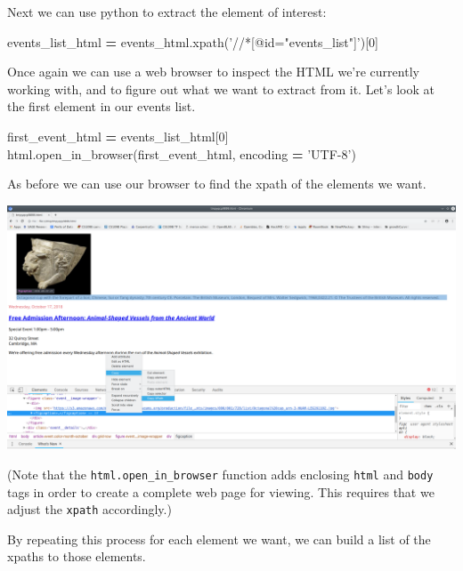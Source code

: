 \documentclass[
]{book}
\newenvironment{Shaded}{\begin{snugshade}}{\end{snugshade}}
\newcommand{\DecValTok}[1]{\textcolor[rgb]{0.00,0.00,0.81}{#1}}
\newcommand{\NormalTok}[1]{#1}
\newcommand{\OperatorTok}[1]{\textcolor[rgb]{0.81,0.36,0.00}{\textbf{#1}}}
\newcommand{\StringTok}[1]{\textcolor[rgb]{0.31,0.60,0.02}{#1}}
\begin{document}
Next we can use python to extract the element of interest:

\begin{Shaded}
\begin{Highlighting}[]
\NormalTok{events_list_html }\OperatorTok{=}\NormalTok{ events_html.xpath(}\StringTok{'//*[@id="events_list"]'}\NormalTok{)[}\DecValTok{0}\NormalTok{]}
\end{Highlighting}
\end{Shaded}

Once again we can use a web browser to inspect the HTML we're
currently working with, and to figure out what we want to extract from
it. Let's look at the first element in our events list.

\begin{Shaded}
\begin{Highlighting}[]
\NormalTok{first_event_html }\OperatorTok{=}\NormalTok{ events_list_html[}\DecValTok{0}\NormalTok{]}
\NormalTok{html.open_in_browser(first_event_html, encoding }\OperatorTok{=} \StringTok{'UTF-8'}\NormalTok{)}
\end{Highlighting}
\end{Shaded}

As before we can use our browser to find the xpath of the elements we
want.

\includegraphics{Python/PythonWebScrape/images/dev_tools_figcaption.png}

(Note that the \texttt{html.open\_in\_browser} function adds enclosing \texttt{html}
and \texttt{body} tags in order to create a complete web page for viewing.
This requires that we adjust the \texttt{xpath} accordingly.)

By repeating this process for each element we want, we can build a
list of the xpaths to those elements.
\end{document}
